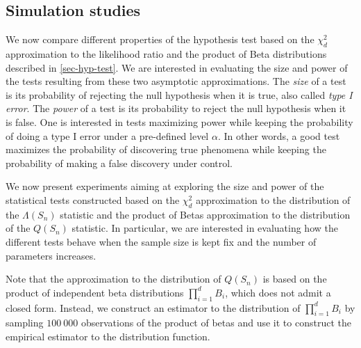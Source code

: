 \subsection{Simulation studies}

We now compare different properties of the hypothesis test based on the $\chi^2_d$ approximation to the likelihood ratio and the product of Beta distributions described in \ref{sec-hyp-test}. We are interested in evaluating the size and power of the tests resulting from these two asymptotic approximations. The \textit{size} of a test is its probability of rejecting the null hypothesis when it is true, also called \textit{type I error}. The \textit{power} of a test is its probability to reject the null hypothesis when it is false. One is interested in tests maximizing power while keeping the probability of doing a type I error under a pre-defined level $\alpha$. In other words, a good test maximizes the probability of discovering true phenomena while keeping the probability of making a false discovery under control. 

We now present experiments aiming at exploring the size and power of the statistical tests constructed based on the $\chi^2_d$ approximation to the distribution of the $\Lambda(S_n)$ statistic and the product of Betas approximation to the distribution of the $Q(S_n)$ statistic. In particular, we are interested in evaluating how the different tests behave when the sample size is kept fix and the number of parameters increases.

Note that the approximation to the distribution of $Q(S_n)$ is based on the product of independent beta distributions $\prod_{i=1}^d B_i$, which does not admit a closed form. Instead, we construct an estimator to the distribution of $\prod_{i=1}^d B_i$ by sampling $100\ 000$ observations of the product of betas and use it to construct the empirical estimator to the distribution function.

